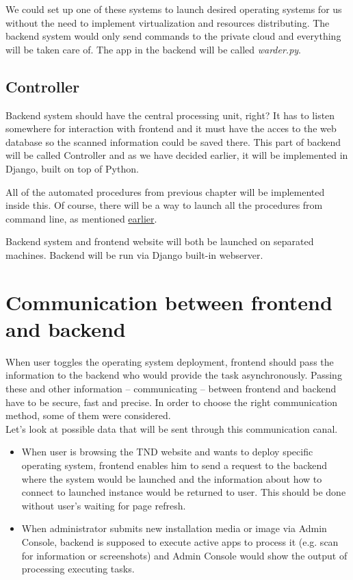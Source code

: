 \documentclass[thesis=B,english]{FITthesis}[2013/04/26]
\begin{document}
We could set up one of these systems to launch desired operating systems for us without the need to implement virtualization and resources distributing. The backend system would only send commands to the private cloud and everything will be taken care of. The app in the backend will be called \emph{warder.py}.

\subsection{Controller}

Backend system should have the central processing unit, right? It has to listen somewhere for interaction with frontend and it must have the acces to the web database so the scanned information could be saved there. This part of backend will be called Controller and as we have decided earlier, it will be implemented in Django, built on top of Python.

All of the automated procedures from previous chapter will be implemented inside this. Of course, there will be a way to launch all the procedures from command line, as mentioned \hyperref[TODO]{earlier}.

Backend system and frontend website will both be launched on separated machines. Backend will be run via Django built-in webserver.

\section{Communication between frontend and backend}

When user toggles the operating system deployment, frontend should pass the information to the backend who would provide the task asynchronously. Passing these and other information -- communicating -- between frontend and backend have to be secure, fast and precise. In order to choose the right communication method, some of them were considered. \\

Let's look at possible data that will be sent through this communication canal.

\begin{itemize}
	\item When user is browsing the TND website and wants to deploy specific operating system, frontend enables him to send a request to the backend where the system would be launched and the information about how to connect to launched instance would be returned to user. This should be done without user's waiting for page refresh.
	\item When administrator submits new installation media or image via Admin Console, backend is supposed to execute active apps to process it (e.g. scan for information or screenshots) and Admin Console would show the output of processing executing tasks.
\end{itemize}
\end{document}
